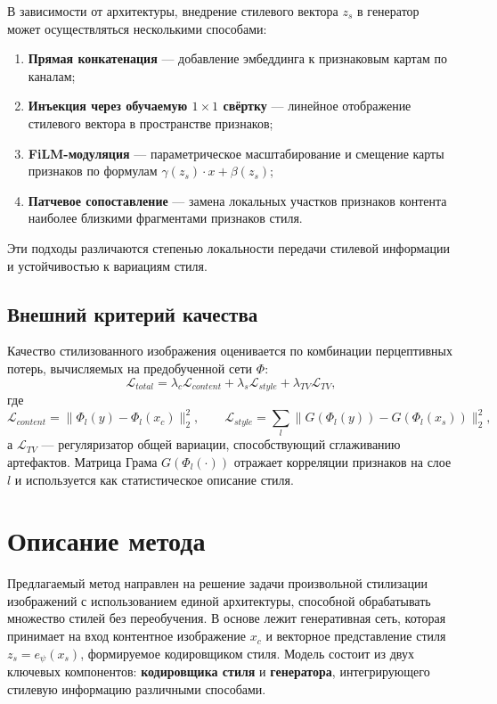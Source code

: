 \documentclass{article}
\begin{document}
В зависимости от архитектуры, внедрение стилевого вектора $z_s$ в генератор может осуществляться несколькими способами:
\begin{enumerate}
    \item \textbf{Прямая конкатенация} — добавление эмбеддинга к признаковым картам по каналам;
    \item \textbf{Инъекция через обучаемую $1 \times 1$ свёртку} — линейное отображение стилевого вектора в пространстве признаков;
    \item \textbf{FiLM-модуляция} — параметрическое масштабирование и смещение карты признаков по формулам $\gamma(z_s) \cdot x + \beta(z_s)$;
    \item \textbf{Патчевое сопоставление} — замена локальных участков признаков контента наиболее близкими фрагментами признаков стиля.
\end{enumerate}

Эти подходы различаются степенью локальности передачи стилевой информации и устойчивостью к вариациям стиля.

\subsection*{Внешний критерий качества}

Качество стилизованного изображения оценивается по комбинации перцептивных потерь, вычисляемых на предобученной сети $\Phi$:
$$
\mathcal{L}_{total} = \lambda_c \mathcal{L}_{content} + \lambda_s \mathcal{L}_{style} + \lambda_{TV}\mathcal{L}_{TV},
$$
где
$$
\mathcal{L}_{content} = \| \Phi_l(y) - \Phi_l(x_c) \|_2^2, \qquad
\mathcal{L}_{style} = \sum_{l} \| G(\Phi_l(y)) - G(\Phi_l(x_s)) \|_2^2,
$$
а $\mathcal{L}_{TV}$ — регуляризатор общей вариации, способствующий сглаживанию артефактов.  
Матрица Грама $G(\Phi_l(\cdot))$ отражает корреляции признаков на слое $l$ и используется как статистическое описание стиля.
\section{Описание метода}

Предлагаемый метод направлен на решение задачи произвольной стилизации изображений с использованием единой архитектуры, способной обрабатывать множество стилей без переобучения.  
В основе лежит генеративная сеть, которая принимает на вход контентное изображение $x_c$ и векторное представление стиля $z_s = e_\psi(x_s)$, формируемое кодировщиком стиля.  
Модель состоит из двух ключевых компонентов: \textbf{кодировщика стиля} и \textbf{генератора}, интегрирующего стилевую информацию различными способами.
\end{document}
